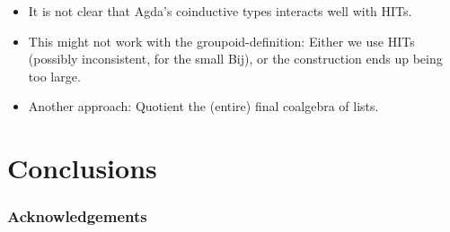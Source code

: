 \documentclass[runningheads]{llncs}
\begin{document}
\begin{itemize}
    \item It is not clear that Agda's coinductive types
        interacts well with HITs.
    \item This might not work with the groupoid-definition:
        Either we use HITs (possibly inconsistent, for the small Bij),
        or the construction ends up being too large.
    \item
        Another approach: Quotient the (entire) final coalgebra of lists.
\end{itemize}

\section{Conclusions}

\subsubsection{Acknowledgements}

\nocite{*}



\end{document}

